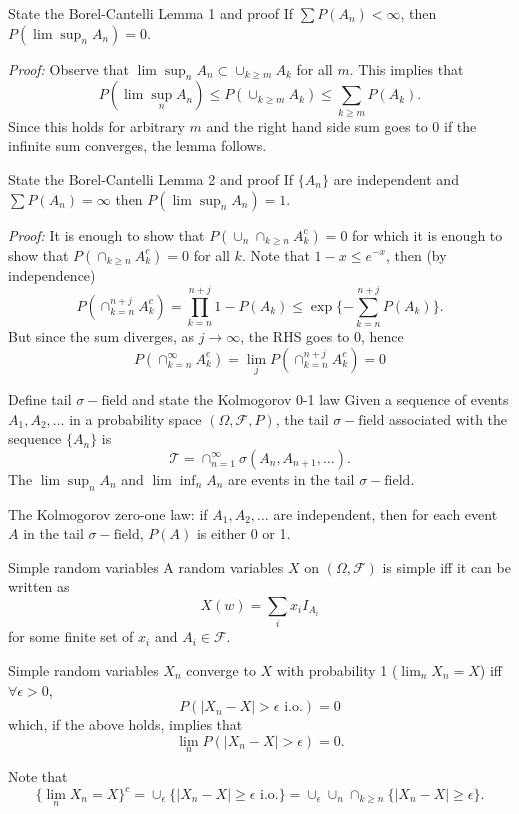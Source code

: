 \documentclass[avery5388,grid,frame]{flashcards}
\newcommand{\sigf}{\sigma-\text{field}}
\newcommand{\F}{\mathcal F}
\begin{document}
\begin{flashcard}
    {State the Borel-Cantelli Lemma 1 and proof}
    If $\sum P(A_n) < \infty$, then $P(\lim \sup_n A_n) = 0$.

    \emph{Proof:} Observe that $\lim \sup_n A_n \subset \cup_{k \geq m} A_k$ for all $m$.
    This implies that
    $$P(\lim \sup_n A_n) \leq P(\cup_{k \geq m} A_k) \leq \sum_{k \geq m} P(A_k).$$
    Since this holds for arbitrary $m$ and the right hand side sum goes to $0$ if the infinite sum converges, the lemma follows.
\end{flashcard}


\begin{flashcard}
    {State the Borel-Cantelli Lemma 2 and proof}
    If $\{ A_n \}$ are independent and $\sum P(A_n) = \infty$ then $P(\lim \sup_n A_n) = 1$.

    \emph{Proof:} It is enough to show that $P(\cup_n \cap_{k \geq n} A_k^c) = 0$ for which it is enough to show that $P(\cap_{k \geq n} A_k^c) = 0$ for all $k$. Note that $1 - x \leq e^{-x}$, then (by independence)
    $$P(\cap_{k = n}^{n + j} A_k^c) = \prod_{k = n}^{n+j} 1 - P(A_k) \leq \exp \{ - \sum_{k = n}^{n + j} P(A_k) \}.$$
    But since the sum diverges, as $j \rightarrow \infty$, the RHS goes to 0, hence
    $$P( \cap_{k=n}^\infty A_k^c ) = \lim_j P(\cap_{k=n}^{n+j} A_k^c) = 0$$
\end{flashcard}


\begin{flashcard}
    {Define tail $\sigf$ and state the Kolmogorov 0-1 law}
    Given a sequence of events $A_1, A_2, \dots$ in a probability space $(\Omega, \F, P)$, the tail $\sigf$ associated with the sequence $\{ A_n \}$ is
    $$\mathcal T = \cap_{n=1}^\infty \sigma(A_n, A_{n+1}, \dots).$$
    The $\lim \sup_n A_n$ and $\lim \inf_n A_n$ are events in the tail $\sigf$.

    The Kolmogorov zero-one law: if $A_1, A_2, \dots$ are independent, then for each event $A$ in the tail $\sigf$, $P(A)$ is either 0 or 1.
\end{flashcard}


\begin{flashcard}
    {Simple random variables}
    A random variables $X$ on $(\Omega, \F)$ is simple iff it can be written as
    $$X(w) = \sum_i x_i I_{A_i}$$
    for some finite set of $x_i$ and $A_i \in \F$.

    Simple random variables $X_n$ converge to $X$ with probability 1 ($\lim_n X_n = X$) iff $\forall \epsilon > 0$,
    $$P(|X_n - X| > \epsilon \text{ i.o.}) = 0$$
    which, if the above holds, implies that
    $$\lim_n P(|X_n - X| > \epsilon) = 0.$$

    Note that
    $$\{ \lim_n X_n = X \}^c = \cup_\epsilon \{ | X_n - X | \geq \epsilon \text{ i.o.} \} = \cup_\epsilon \cup_n \cap_{k \geq n} \{ |X_n - X| \geq \epsilon \}.$$
\end{flashcard}
\end{document}
